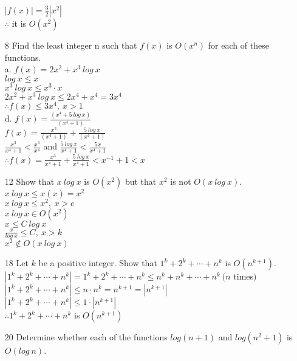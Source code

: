\documentclass[a4paper]{article}
\newcommand\tab[1][0.5cm]{\hspace*{#1}}
\begin{document}
\begin{itemize}
    \tab $|f(x)| = \frac{3}{2}|x^2|$ \\
    \tab $\therefore$ it is $O(x^2)$
    \item[8] Find the least integer n such that $f(x)$ is $O(x^n)$ for each of these functions. \\
      a. $f(x) = 2x^2 + x^{3}\ log\ x$ \\
      \tab $log\ x \leq x$ \\
      \tab $x^{3}\ log\ x \leq x^{3} \cdot x$ \\
      \tab $2x^{2} + x^{3}\ log\ x \leq 2x^{4} + x^{4} = 3x^{4}$ \\
      \tab $\therefore f(x) \leq 3x^{4},\ x > 1$ \\
      d. $f(x) = \frac{(x^4 + 5\ log\ x)}{(x^4 + 1)}$ \\
      \tab $f(x) = \frac{x^{3}}{(x^{4} + 1)} + \frac{5\ log\ x}{(x^{4} + 1)}$ \\
      \tab $\frac{x^3}{x^4 + 1} < \frac{x^3}{x^4}$ and $\frac{5\ log\ x}{x^4 + 1} < \frac{5x}{x^4 + 1}$ \\
      \tab $\therefore f(x) = \frac{x^3}{x^4 + 1} + \frac{5\ log\ x}{x^4 + 1} < x^{-1} + 1 < x$
    \item[12] Show that $x\ log\ x$ is $O(x^2)$ but that $x^2$ is not $O(x\ log\ x)$. \\
    \tab $x\ log\ x \leq x(x) = x^2$ \\
    \tab $x\ log\ x \leq x^{2},\ x > e$ \\
    \tab $x\ log\ x \in O(x^2)$ \\
    \tab $x \leq C\ log\ x$ \\
    \tab $\frac{x}{log\ x} \leq C,\ x > k$ \\
    \tab $x^2 \notin O(x\ log\ x)$ 
    \item[18] Let $k$ be a positive integer. Show that $1^k + 2^k + \cdots + n^k$ is $O(n^{k+1})$. \\
    \tab $|1^k + 2^k + \cdots + n^k| = 1^k + 2^k + \cdots + n^k \leq n^k + n^k + \cdots + n^{k}\ (n$ times$)$ \\
    \tab $|1^k + 2^k + \cdots + n^k| \leq n \cdot n^k = n^{k + 1} = |n^{k + 1}|$ \\
    \tab $|1^k + 2^k + \cdots + n^k| \leq 1 \cdot |n^{k + 1}|$ \\
    \tab $\therefore 1^k + 2^k + \cdots + n^k$ is $O(n^{k + 1})$
    \item[20] Determine whether each of the functions $log(n + 1)$ and $log(n^2 + 1)$ is $O(log\ n)$. \\

\end{itemize}
\end{document}
